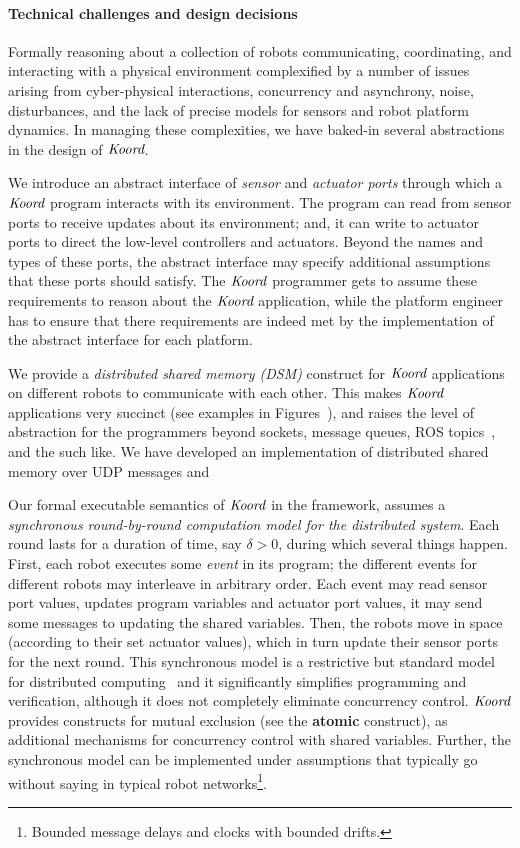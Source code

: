 \paragraph{Technical challenges and design decisions}
Formally reasoning about a collection of robots communicating, coordinating, and interacting with a physical environment complexified by a number of issues arising from cyber-physical interactions, concurrency and asynchrony, noise, disturbances, and the lack of precise models for sensors and robot platform dynamics.
%
In managing these complexities, we have baked-in several abstractions in the design of $\emph{Koord}$.
%
\begin{inparaenum}[(i)]
\item We introduce an abstract interface of \emph{sensor} and \emph{actuator ports} through which a $\emph{Koord}$ program interacts with its environment. The program can read from sensor ports to receive updates about its environment;  and, it can write to actuator ports to direct the low-level controllers and actuators. Beyond the names and types of these ports, the abstract interface may specify additional assumptions  that these ports should satisfy. The $\emph{Koord}$ programmer gets to assume these requirements to reason about the $\emph{Koord}$ application, while the platform engineer has to ensure that there requirements are indeed met by the implementation of the abstract interface for each platform.
\item We provide a {\em distributed shared memory (DSM)\/} construct for $\emph{Koord}$ applications  on different robots to communicate with each other. This makes  $\emph{Koord}$ applications very succinct (see examples in Figures~{}), and raises the level of abstraction for the programmers beyond sockets, message queues, ROS topics~\cite{}, and the such like. We have developed an implementation of distributed shared memory over UDP messages and 
\item Our formal executable semantics of $\emph{Koord}$ in the \K framework, assumes a {\em synchronous round-by-round computation model for the distributed system\/}. Each round lasts for a duration of time, say $\delta >0$, during which several things happen. First, each robot  executes some {\em event\/} in its program; the different events for different robots may interleave in arbitrary order. Each event may read sensor port values, updates program variables and actuator port values, it may send  some messages to updating the shared variables. Then, the  robots move in space (according to their set actuator values), which in turn update their sensor ports for the next round. This synchronous  model is a restrictive but standard model for distributed computing~\cite{lynch1996a,attiyawelch} and it significantly simplifies programming and verification, although it does not completely eliminate concurrency control. $\emph{Koord}$ provides constructs for mutual exclusion (see the \textbf{atomic} construct), as additional mechanisms for concurrency control with shared variables. Further, the synchronous model can be implemented under  assumptions that typically go without saying in typical robot networks\footnote{Bounded message delays and clocks with bounded drifts.}.  

\end{inparaenum}
